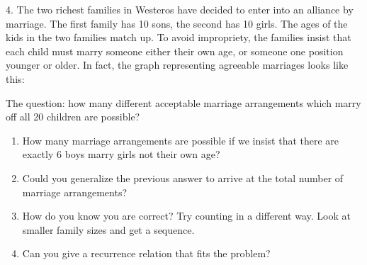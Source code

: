 \documentclass[10pt,]{book}
\theoremstyle{plain}
\theoremstyle{definition}
\numberwithin{equation}{chapter}
\newcommand{\vtx}[2]{node[fill,circle,inner sep=0pt, minimum size=4pt,label=#1:#2]{}}
\renewcommand{\v}{\vtx{above}{}}
\begin{document}
\begin{exerciselist}
\par\smallskip
\item[4.]\hypertarget{exercise-317}{}
        The two richest families in Westeros have decided to enter into an alliance by marriage. The first family has 10 sons, the second has 10 girls. The ages of the kids in the two families match up. To avoid impropriety, the families insist that each child must marry someone either their own age, or someone one position younger or older. In fact, the graph representing agreeable marriages looks like this:
\leavevmode%
\begin{figure}
\centering
{
}
\end{figure}
\par

        The question: how many different acceptable marriage arrangements which marry off all 20 children are possible?
        \leavevmode%
\begin{enumerate}[label=(\alph*)]
\item\hypertarget{li-811}{} How many marriage arrangements are possible if we insist that there are exactly 6 boys marry girls not their own age? %
\item\hypertarget{li-812}{} Could you generalize the previous answer to arrive at the total number of marriage arrangements? %
\item\hypertarget{li-813}{} How do you know you are correct? Try counting in a different way. Look at smaller family sizes and get a sequence. %
\item\hypertarget{li-814}{} Can you give a recurrence relation that fits the problem? %
\end{enumerate}


\end{exerciselist}
\end{document}
